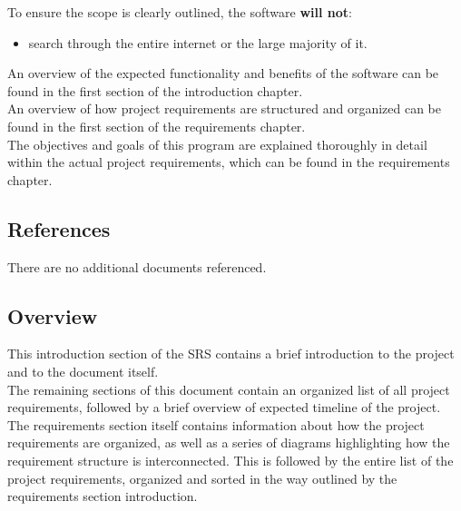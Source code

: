 To ensure the scope is clearly outlined, the software \textbf{will not}:
\begin{itemize}
    \item search through the entire internet or the large majority of it.
\end{itemize}

An overview of the expected functionality and benefits of the software can be found in the first section of the introduction chapter. \\

An overview of how project requirements are structured and organized can be found in the first section of the requirements chapter. \\

The objectives and goals of this program are explained thoroughly in detail within the actual project requirements, which can be found in the requirements chapter. \\

\subsection{References}

There are no additional documents referenced.

\subsection{Overview}

This introduction section of the SRS contains a brief introduction to the project \projectname and to the document itself. \\

The remaining sections of this document contain an organized list of all project requirements, followed by a brief overview of expected timeline of the project. \\

The requirements section itself contains information about how the project requirements are organized, as well as a series of diagrams highlighting how the requirement structure is interconnected.
This is followed by the entire list of the project requirements, organized and sorted in the way outlined by the requirements section introduction. \\

